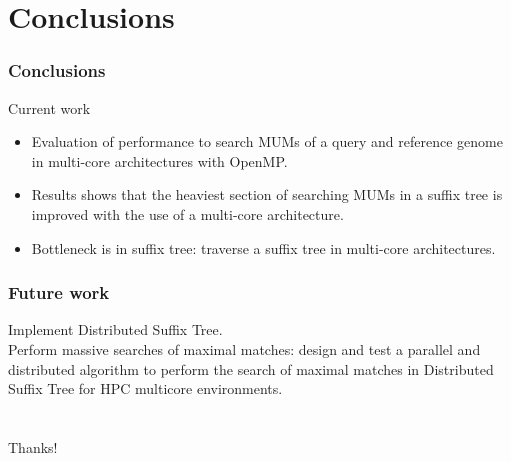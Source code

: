 \documentclass{beamer}
\begin{document}
\section{Conclusions}
    \begin{frame}
    \frametitle{Conclusions}
    \begin{block}{Current work}
      \begin{itemize}
        \item Evaluation of performance to search MUMs of a query and reference genome in multi-core architectures with OpenMP.
        \item Results shows that the heaviest section of searching MUMs in a suffix tree is improved with the use of a multi-core architecture. 
        \item Bottleneck is in suffix tree: traverse a suffix tree in multi-core architectures.
      \end{itemize}
\end{block}
\end{frame}
\begin{frame}
  \frametitle{Future work}
\begin{block}{}
Implement Distributed Suffix Tree.\\
Perform massive searches of maximal matches: design and test a parallel and distributed algorithm to perform the search of maximal matches in Distributed Suffix Tree for HPC multicore environments.
\end{block}
\end{frame}
\section{}
\begin{frame}
  \begin{center}
    \Huge{Thanks!}
\end{center}
\end{frame}
\begin{frame}
  \titlepage
\end{frame}
\end{document}

